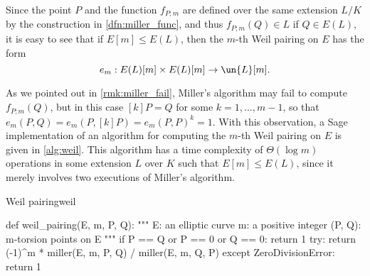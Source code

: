 

Since the point $P$ and the function $f_{P;m}$ are defined over the same extension $L / K$ by the construction in \cref{dfn:miller_func}, and thus $f_{P;m}(Q) \in L$ if $Q \in E(L)$, it is easy to see that if $E[m] \leq E(L)$, then the $m$-th Weil pairing on $E$ has the form \[e_m : E(L)[m] \times E(L)[m] \to \un{L}[m].\]

As we pointed out in \cref{rmk:miller_fail}, Miller's algorithm may fail to compute $f_{P;m}(Q)$, but in this case $[k]P = Q$ for some $k = 1, \ldots, m-1$, so that $e_m(P, Q) = e_m(P, [k]P) = e_m(P, P)^k = 1$. With this observation, a Sage implementation of an algorithm for computing the $m$-th Weil pairing on $E$ is given in \cref{alg:weil}. This algorithm has a time complexity of $\Theta(\log m)$ operations in some extension $L$ over $K$ such that $E[m] \leq E(L)$, since it merely involves two executions of Miller's algorithm.

\begin{alg}{Weil pairing}{weil}
\begin{sagecode}
def weil_pairing(E, m, P, Q):
    """
    E: an elliptic curve
    m: a positive integer
    (P, Q): m-torsion points on E
    """
    if P == Q or P == 0 or Q == 0:
        return 1
    try:
        return (-1)^m * miller(E, m, P, Q) / miller(E, m, Q, P)
    except ZeroDivisionError:
        return 1
\end{sagecode}
\end{alg}
